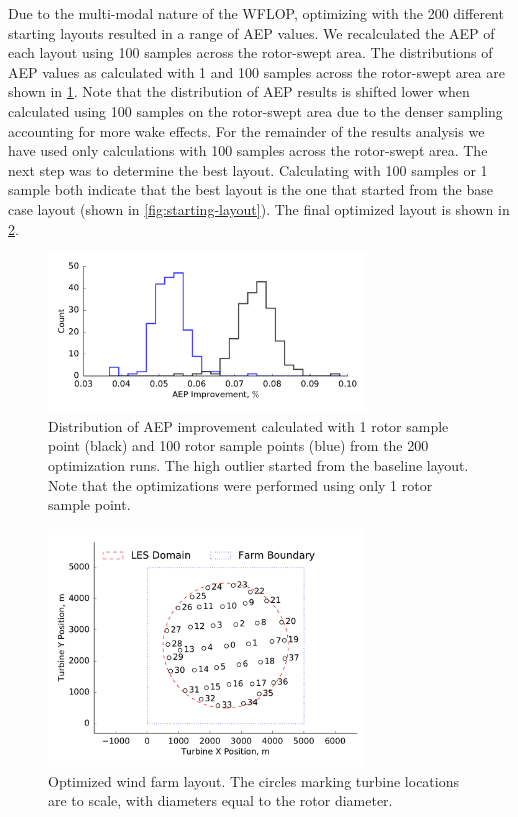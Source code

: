 \documentclass[conf]{new-aiaa}
\begin{document}
Due to the multi-modal nature of the WFLOP, optimizing with the 200 different starting layouts resulted in a range of AEP values. We recalculated the AEP of each layout using 100 samples across the rotor-swept area. The distributions of AEP values as calculated with 1 and 100 samples across the rotor-swept area are shown in \cref{fig:opt-distribution}. Note that the distribution of AEP results is shifted lower when calculated using 100 samples on the rotor-swept area due to the denser sampling accounting for more wake effects. For the remainder of the results analysis we have used only calculations with 100 samples across the rotor-swept area. The next step was to determine the best layout. Calculating with 100 samples or 1 sample both indicate that the best layout is the one that started from the base case layout (shown in \cref{fig:starting-layout}). The final optimized layout is shown in \cref{fig:optimized-layout}.
%
\begin{figure}[htpb!]
	\centering
	\includegraphics[width=0.75\textwidth]{final_images/38turbs_results_hist_aep.pdf}
	\caption{Distribution of AEP improvement calculated with 1 rotor sample point (black) and 100 rotor sample points (blue) from the 200 optimization runs. The high outlier started from the baseline layout. Note that the optimizations were performed using only 1 rotor sample point.}
	\label{fig:opt-distribution}
\end{figure}
%
\begin{figure}[htpb!]
	\centering
	\includegraphics[width=0.75\textwidth]{final_images/round_farm_38Turbines_5DSpacing_finish.pdf}
	\caption{Optimized wind farm layout. The circles marking turbine locations are to scale, with diameters equal to the rotor diameter.}
	\label{fig:optimized-layout}
\end{figure}
\end{document}
